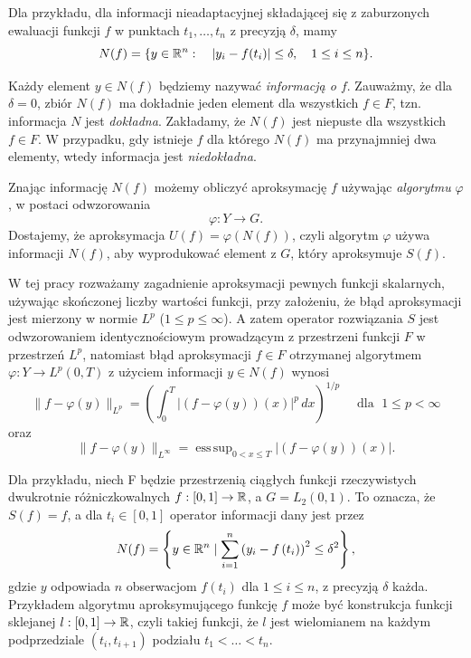 \documentclass[oik, pdftex, man]{mgrwms}
\DeclareMathOperator*{\esssup}{ess\,sup}
\begin{document}
    Dla przykładu, dla informacji nieadaptacyjnej składającej się z zaburzonych ewaluacji funkcji $f$ w punktach $t_{1}, \dots, t_{n}$ z precyzją $\delta$, mamy
    \begin{equation*}
        N(f) = \{y \in \mathbb{R}^{n} : \quad |y_{i} - f(t_{i})| \leq \delta, \quad 1 \leq i \leq n\}.
    \end{equation*}
    
    Każdy element $y \in N(f)$ będziemy nazywać \textit{informacją o $f$}. Zauważmy, że dla $\delta = 0$, zbiór $N(f)$ ma dokładnie jeden element dla wszystkich $f \in F$, tzn. informacja $N$ jest \textit{dokładna}. Zakładamy, że $N(f)$ jest niepuste dla wszystkich $f \in F$. W przypadku, gdy istnieje $f$ dla którego $N(f)$ ma przynajmniej dwa elementy, wtedy informacja jest \textit{niedokładna}.

    Znając informację $N(f)$ możemy obliczyć aproksymację $f$ używając \textit{algorytmu} $\varphi$, w postaci odwzorowania
    \begin{equation*}
        \varphi : Y \rightarrow G.
    \end{equation*}
    Dostajemy, że aproksymacja $U(f) = \varphi(N(f))$, czyli algorytm $\varphi$ używa informacji $N(f)$, aby wyprodukować element z $G$, który aproksymuje $S(f)$.

    W tej pracy rozważamy zagadnienie aproksymacji pewnych funkcji skalarnych, używając skończonej liczby wartości funkcji, przy założeniu, że błąd aproksymacji jest mierzony w normie $L^{p}$ ($1 \leq p \leq \infty$). A zatem operator rozwiązania $S$ jest odwzorowaniem identycznościowym prowadzącym z przestrzeni funkcji $F$ w przestrzeń $L^{p}$, natomiast błąd aproksymacji $f \in F$ otrzymanej algorytmem $\varphi : Y \rightarrow L^{p}(0,T)$ z użyciem informacji $y \in N(f)$ wynosi
    \begin{equation*}
        \|f-\varphi(y)\|_{L^p} = \left( \int_{0}^{T} |(f-\varphi(y))(x)|^p \,dx  \right)^{1/p} \quad \text{ dla } \; 1 \leq p < \infty
    \end{equation*}
    oraz
    \begin{equation*}
        \|f-\varphi(y)\|_{L^\infty} = \esssup_{0 < x \leq T} | (f - \varphi(y))(x) |.
    \end{equation*}


    Dla przykładu, niech F będzie przestrzenią ciągłych funkcji rzeczywistych dwukrotnie różniczkowalnych $f: [0,1] \rightarrow \mathbb{R}$, a $G=L_{2}(0,1)$. To oznacza, że $S(f) = f$, a dla $t_{i} \in [0,1]$ operator informacji dany jest przez
    \begin{equation*}
        N(f)=\left\{y \in \mathbb{R}^{n} \mid \sum_{i=1}^{n}\left(y_{i}-f\left(t_{i}\right)\right)^{2} \leq \delta^{2}\right\},
    \end{equation*}
    gdzie $y$ odpowiada $n$ obserwacjom $f(t_{i})$ dla $1 \leq i \leq n$, z precyzją $\delta$ każda. Przykładem algorytmu aproksymującego funkcję $f$ może być konstrukcja funkcji sklejanej $l: [0,1] \rightarrow \mathbb{R}$, czyli takiej funkcji, że $l$ jest wielomianem na każdym podprzedziale $(t_{i}, t_{i+1})$ podziału $t_{1} < \ldots < t_{n}$.
\end{document}
